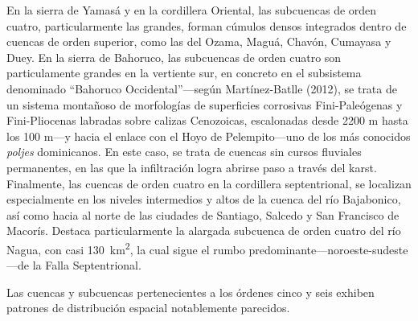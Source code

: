 \documentclass[spanish]{article}
\begin{document}
En la sierra de Yamasá y en la cordillera Oriental, las subcuencas de
orden cuatro, particularmente las grandes, forman cúmulos densos
integrados dentro de cuencas de orden superior, como las del Ozama,
Maguá, Chavón, Cumayasa y Duey. En la sierra de Bahoruco, las subcuencas
de orden cuatro son particulamente grandes en la vertiente sur, en
concreto en el subsistema denominado ``Bahoruco Occidental''---según
Martínez-Batlle (2012), se trata de un sistema montañoso de morfologías
de superficies corrosivas Fini-Paleógenas y Fini-Pliocenas labradas
sobre calizas Cenozoicas, escalonadas desde 2200 m hasta los 100 m---y
hacia el enlace con el Hoyo de Pelempito---uno de los más conocidos
\emph{poljes} dominicanos. En este caso, se trata de cuencas sin cursos
fluviales permanentes, en las que la infiltración logra abrirse paso a
través del karst. Finalmente, las cuencas de orden cuatro en la
cordillera septentrional, se localizan especialmente en los niveles
intermedios y altos de la cuenca del río Bajabonico, así como hacia al
norte de las ciudades de Santiago, Salcedo y San Francisco de Macorís.
Destaca particularmente la alargada subcuenca de orden cuatro del río
Nagua, con casi 130~km\textsuperscript{2}, la cual sigue el rumbo
predominante---noroeste-sudeste---de la Falla Septentrional.

Las cuencas y subcuencas pertenecientes a los órdenes cinco y seis
exhiben patrones de distribución espacial notablemente parecidos.
\end{document}

